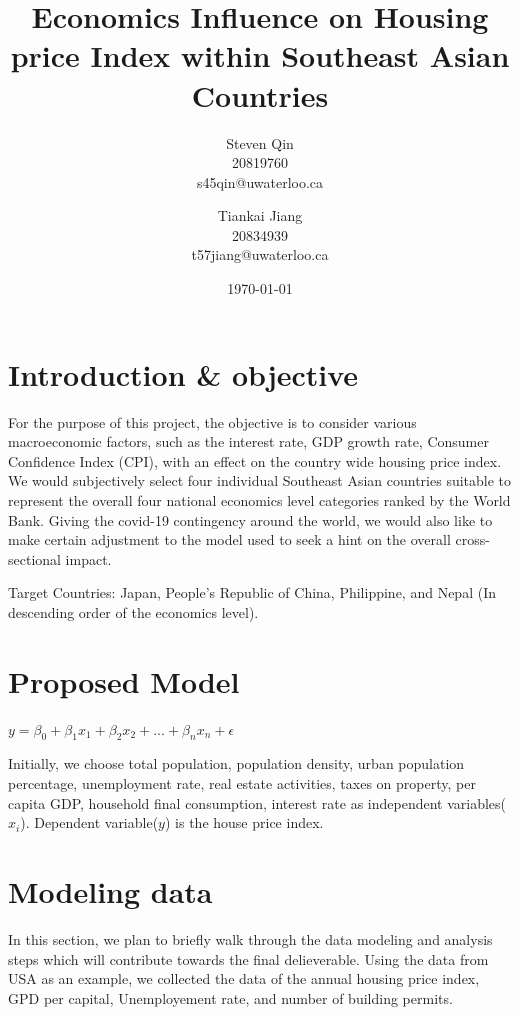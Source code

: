 \documentclass[11pt]{article}
\title{Economics Influence on Housing price Index within Southeast Asian Countries}
\author{Steven Qin\\20819760\\s45qin@uwaterloo.ca \and Tiankai Jiang\\20834939\\t57jiang@uwaterloo.ca}
\date{\today}
\begin{document}
\maketitle

\section{Introduction \& objective}\label{section-introduction}
For the purpose of this project, the objective is to consider various macroeconomic factors, such as the interest rate, GDP growth rate, Consumer Confidence Index (CPI), with an effect on the country wide housing price index. We would subjectively select four individual Southeast Asian countries suitable to represent the overall four national economics level categories ranked by the World Bank. Giving the covid-19 contingency around the world, we would also like to make certain adjustment to the model used to seek a hint on the overall cross-sectional impact.

Target Countries: Japan, People’s Republic of China, Philippine, and Nepal (In descending order of the economics level).

\section{Proposed Model}\label{section-proposedmodel}
$y = \beta_0 + \beta_1x_1 + \beta_2x_2 + ... + \beta_nx_n + \epsilon$

Initially, we choose total population, population density, urban population percentage, unemployment rate, real estate activities, taxes on property, per capita GDP, household final consumption, interest rate\citep{10.2307/23606731, 10.2139/ssrn.2431627, aei297454} as independent variables($x_i$). Dependent variable($y$) is the house price index.

\section{Modeling data}\label{section-proposedmodel}
In this section, we plan to briefly walk through the data modeling and analysis steps which will contribute towards the final delieverable. Using the data from USA as an example, we collected the data of the annual housing price index, GPD per capital, Unemployement rate, and number of building permits.
\end{document}
